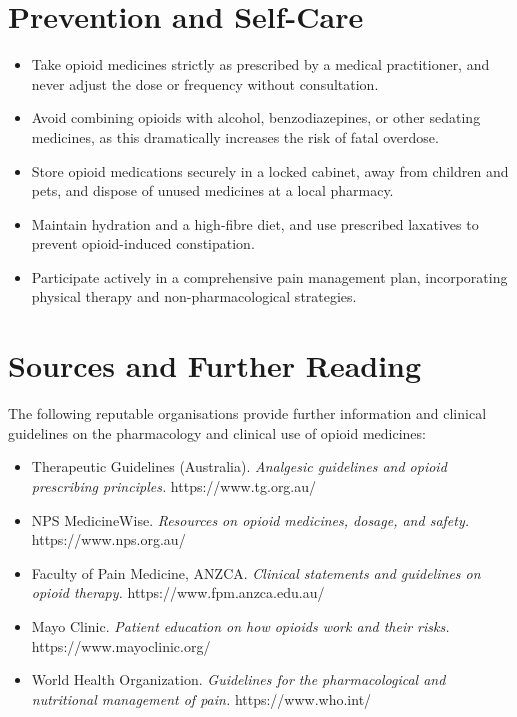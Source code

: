 \section*{Prevention and Self-Care}
\begin{itemize}
    \item Take opioid medicines strictly as prescribed by a medical practitioner, and never adjust the dose or frequency without consultation.
    \item Avoid combining opioids with alcohol, benzodiazepines, or other sedating medicines, as this dramatically increases the risk of fatal overdose.
    \item Store opioid medications securely in a locked cabinet, away from children and pets, and dispose of unused medicines at a local pharmacy.
    \item Maintain hydration and a high-fibre diet, and use prescribed laxatives to prevent opioid-induced constipation.
    \item Participate actively in a comprehensive pain management plan, incorporating physical therapy and non-pharmacological strategies.
\end{itemize}

\section*{Sources and Further Reading}
The following reputable organisations provide further information and clinical guidelines on the pharmacology and clinical use of opioid medicines:
\begin{itemize}
    \item Therapeutic Guidelines (Australia). \textit{Analgesic guidelines and opioid prescribing principles.} https://www.tg.org.au/
    \item NPS MedicineWise. \textit{Resources on opioid medicines, dosage, and safety.} https://www.nps.org.au/
    \item Faculty of Pain Medicine, ANZCA. \textit{Clinical statements and guidelines on opioid therapy.} https://www.fpm.anzca.edu.au/
    \item Mayo Clinic. \textit{Patient education on how opioids work and their risks.} https://www.mayoclinic.org/
    \item World Health Organization. \textit{Guidelines for the pharmacological and nutritional management of pain.} https://www.who.int/
\end{itemize}
